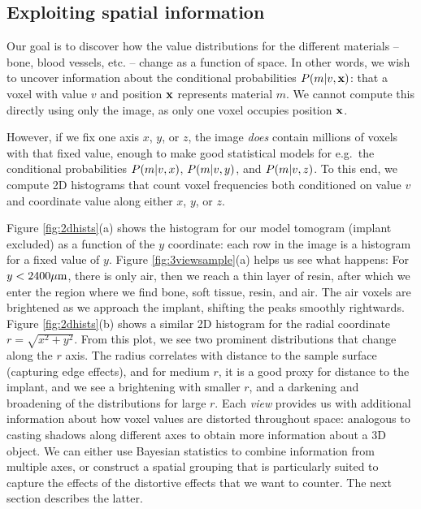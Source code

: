 \documentclass[pdflatex,sn-mathphys]{sn-jnl}%
\theoremstyle{thmstyleone}%
\theoremstyle{thmstyletwo}%
\theoremstyle{thmstylethree}%
\begin{document}
\subsection{Exploiting spatial information}
Our goal is to discover how the value distributions for the different materials -- bone, blood vessels, etc. --
change as a function of space. In other words, we wish to uncover information about the conditional probabilities $P\!\left(m\middle\vert v,\mathbf{x}\right)$: that a voxel with value $v$ and
position $\mathbf{x}$ represents material $m$. We cannot compute this directly using only the image, as only one voxel occupies position $\mathbf{x}$. 

However, if we fix one axis $x$, $y$, or $z$, the image {\em does} contain millions of voxels with that fixed value, enough to make good statistical
models for e.g.~the conditional probabilities $P\!\left(m\middle\vert v,x\right)$, $P\!\left(m\middle\vert v,y\right)$, and $P\!\left(m\middle\vert v,z\right)$. To this end, we compute 2D histograms that count voxel frequencies
both conditioned on value $v$ and coordinate value along either $x$, $y$, or $z$. 

Figure \ref{fig:2dhists}(a)
shows the histogram for our model tomogram (implant excluded) as a function of the $y$ coordinate: each row in the image is a histogram for a fixed value of $y$.
Figure \ref{fig:3viewsample}(a) helps us see what happens: For $y<2400\mu\text{m}$, there is only air, then we reach a thin layer of resin, after which we enter
the region where we find bone, soft tissue, resin, and air. The air voxels are brightened as we approach the implant, shifting the peaks smoothly rightwards.
Figure \ref{fig:2dhists}(b) shows a similar 2D histogram for the radial coordinate $r=\sqrt{x^2+y^2}$.
From this plot, we see two prominent distributions that change along the $r$ axis. The radius correlates with distance to the sample surface
(capturing edge effects), and for medium $r$, it is a good proxy for distance to the implant, and we see a brightening with smaller $r$, and a darkening and
broadening of the distributions for large $r$. Each {\em view} provides us with additional information about how voxel values are distorted throughout space:
analogous to casting shadows along different axes to obtain more information about a 3D object. We can either use Bayesian statistics to combine information
from multiple axes, or construct a spatial grouping that is particularly suited to capture the effects of the distortive effects that we want to counter.
The next section describes the latter.
\end{document}
